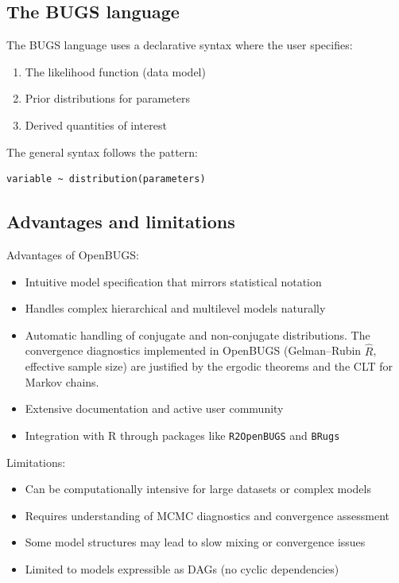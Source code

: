 \subsection{The BUGS language}

The BUGS language uses a declarative syntax where the user specifies:
\begin{enumerate}
    \item The likelihood function (data model)
    \item Prior distributions for parameters
    \item Derived quantities of interest
\end{enumerate}

The general syntax follows the pattern:
\begin{codebox}
\begin{verbatim}
variable ~ distribution(parameters)
\end{verbatim}
\end{codebox}

\subsection{Advantages and limitations}

Advantages of OpenBUGS:
\begin{itemize}
    \item Intuitive model specification that mirrors statistical notation
    \item Handles complex hierarchical and multilevel models naturally
    \item Automatic handling of conjugate and non-conjugate distributions. The convergence diagnostics implemented in OpenBUGS (Gelman–Rubin \(\hat{R}\), effective sample size) are justified by the ergodic theorems and the CLT for Markov chains.
    \item Extensive documentation and active user community
    \item Integration with R through packages like \texttt{R2OpenBUGS} and \texttt{BRugs}
\end{itemize}

Limitations:
\begin{itemize}
    \item Can be computationally intensive for large datasets or complex models
    \item Requires understanding of MCMC diagnostics and convergence assessment
    \item Some model structures may lead to slow mixing or convergence issues
    \item Limited to models expressible as DAGs (no cyclic dependencies)
\end{itemize}

